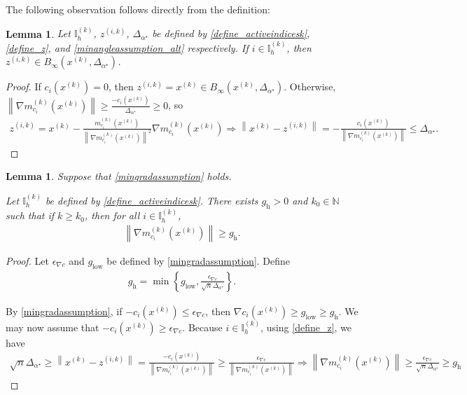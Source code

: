 \documentclass{article}
\newtheorem{lemma}[theorem]{Lemma}
\theoremstyle{case}
\numberwithin{theorem}{subsection}
\newcommand{\gk}{{\nabla m_f^{(k)}\left(\xk\right)}}
\newcommand{\gmcik}{{\nabla m_{c_i}^{(k)}\left(\xk\right)}}
\newcommand{\minangledelta}{{\Delta_{\alpha^{\star}}}}
\newcommand{\mingradepsilon}{{\epsilon_{\nabla c}}}
\newcommand{\mingrad}{{ g_{\textrm{low}} }}
\newcommand{\naturals}{\mathbb N}
\newcommand{\xk}{x^{(k)}}
\newcommand{\zik}{{z^{(i, k)}}}
\newcommand{\activeindicesk}{{ \mathbb I_h^{(k)} }}
\newcommand{\activegradmin}{{ g_{\textrm{h}} }}
\begin{document}

The following observation follows directly from the definition:
\begin{lemma}
\label{doesntreallyneedtobesaid}
Let $\activeindicesk$, $\zik$, $\minangledelta$ be defined by \cref{define_activeindicesk}, \cref{define_z}, and \cref{minangleassumption_alt} respectively.
If $i \in \activeindicesk$, then $\zik \in B_{\infty}\left(\xk, \minangledelta \right)$.
\end{lemma}
\begin{proof}
If $c_i\left(\xk\right) = 0$, then $\zik = \xk \in B_{\infty}\left(\xk, \minangledelta \right)$.
Otherwise, $\left\|\gmcik\right\| \ge \frac{-c_i\left(\xk\right)}{\minangledelta} \ge 0$, so
\begin{align*}
\zik = \xk - \frac{m^{(k)}_{c_i}\left(\xk\right)}{\left\|\gmcik\right\|^2} \gmcik 
\Longrightarrow \left\|\xk - \zik \right\|= -\frac{c_i\left(\xk\right)}{\left\|\gmcik\right\|} \le \minangledelta.
\end{align*}
\end{proof}


\begin{lemma}
\label{underbound}
Suppose that \cref{mingradassumption} holds.

Let $\activeindicesk$ be defined by \cref{define_activeindicesk}.
There exists $\activegradmin > 0$ and $k_0 \in \naturals$ such that if $k \ge k_0$, then
for all $i \in \activeindicesk$,
\begin{align*}
\left\|\gmcik\right\| \ge \activegradmin.
\end{align*}
\end{lemma}
\begin{proof}

Let $\mingradepsilon$ and $\mingrad$ be defined by \cref{mingradassumption}.
Define
\begin{align}
\label{define_activegradmin}
\activegradmin = \min\left\{\mingrad, \frac{\mingradepsilon}{\sqrt{n} \minangledelta}\right\}.
\end{align}

By \cref{mingradassumption}, if $-c_i\left(\xk\right) \le \mingradepsilon$, then $\nabla c_i\left(\xk\right) \ge \mingrad \ge \activegradmin$.
We may now assume that $-c_i\left(\xk\right) \ge \mingradepsilon$.
Because $i \in \activeindicesk$, using \cref{define_z}, we have
\begin{align*}
\sqrt{n} \minangledelta \ge \left\|\xk - \zik \right\|
= \frac{-c_i\left(\xk\right)}{\left\|\gmcik\right\|}
\ge \frac{\mingradepsilon}{\left\|\gmcik\right\|}
\Longrightarrow
\left\|\gmcik\right\| \ge \frac{\mingradepsilon}{\sqrt{n} \minangledelta} \ge \activegradmin
\end{align*}
\end{proof}
\end{document}
